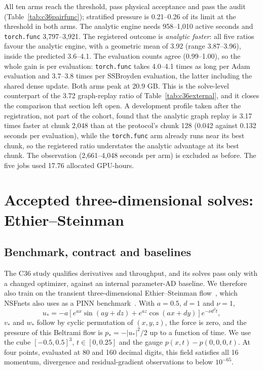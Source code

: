 \documentclass[11pt]{article}
\begin{document}
All ten arms reach the threshold, pass physical acceptance and pass the
audit (Table~\ref{tab:c36pairfunc}); stratified pressure is 0.21--0.26 of
its limit at the threshold in both arms. The analytic engine needs
958--1,010 active seconds and \texttt{torch.func} 3,797--3,921. The
registered outcome is \emph{analytic faster}: all five ratios favour the
analytic engine, with a geometric mean of 3.92 (range 3.87--3.96), inside
the predicted 3.6--4.1. The evaluation counts agree (0.99--1.00), so the
whole gain is per evaluation: \texttt{torch.func} takes 4.0--4.1 times as
long per Adam evaluation and 3.7--3.8 times per SSBroyden evaluation, the
latter including the shared dense update. Both arms peak at 20.9 GB. This
is the solve-level counterpart of the 3.72 graph-replay ratio of
Table~\ref{tab:c36external}, and it closes the comparison that section left
open. A development profile taken after the registration, not part of the
cohort, found that the analytic graph replay is 3.17 times faster at chunk
2,048 than at the protocol's chunk 128 (0.042 against 0.132 seconds per
evaluation), while the \texttt{torch.func} arm already runs near its best
chunk, so the registered ratio understates the analytic advantage at its
best chunk. The observation (2,661--4,048 seconds per arm) is excluded as
before. The five jobs used 17.76 allocated GPU-hours.

\section{Accepted three-dimensional solves: Ethier--Steinman}\label{sec:ethier}
\subsection{Benchmark, contract and baselines}
The C36 study qualifies derivatives and throughput, and its solves pass only
with a changed optimizer, against an internal parameter-AD baseline. We
therefore also train on the transient three-dimensional
Ethier--Steinman flow~\cite{ethier}, which NSFnets also uses as a PINN
benchmark~\cite{nsfnets}. With $a=0.5$, $d=1$ and $\nu=1$,
\begin{equation}
u_*=-a\left[e^{ax}\sin(ay+dz)+e^{az}\cos(ax+dy)\right]e^{-\nu d^2t},
\end{equation}
$v_*$ and $w_*$ follow by cyclic permutation of $(x,y,z)$, the force is
zero, and the pressure of this Beltrami flow is $p_*=-|u_*|^2/2$ up to a
function of time. We use the cube $[-0.5,0.5]^3$, $t\in[0,0.25]$ and the
gauge $p(x,t)-p(0,0,0,t)$. At four points, evaluated at 80 and 160 decimal
digits, this field satisfies all 16 momentum, divergence and
residual-gradient observations to below $10^{-65}$.
\end{document}
